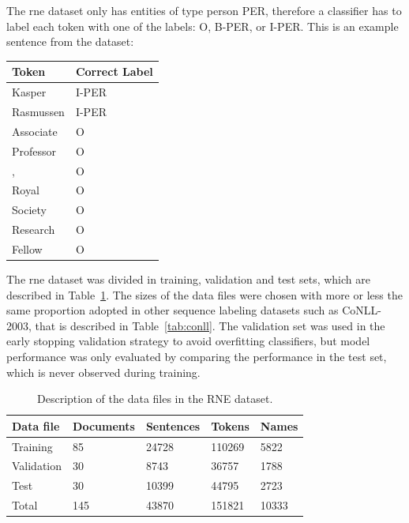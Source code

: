 \documentclass{nle}
\begin{document}
The \gls{rne} dataset only has entities of type person PER, therefore a classifier has to
label each token with one of the labels: O, B-PER, or I-PER. This is an example 
sentence from the dataset:

\begin{table}[h]
  \small
  \begin{center}
    \begin{tabular}{ ll }
      Token & Correct Label \\
      \midrule
      Kasper    & I-PER \\ 
      Rasmussen & I-PER \\
      Associate & O     \\
      Professor & O     \\    
      ,         & O     \\    
      Royal     & O     \\    
      Society   & O     \\    
      Research  & O     \\    
      Fellow    & O     \\    
    \end{tabular}     
  \end{center}
\end{table}

The \gls{rne} dataset was divided in training, validation and test sets, which are described in 
Table~\ref{tab:dataset}. The sizes of the data files were chosen with more or 
less the same proportion adopted in other sequence labeling datasets such
as {CoNLL-2003}, that is described in Table~\ref{tab:conll}. The validation set 
was used in the early stopping 
validation strategy to avoid overfitting classifiers, but model performance 
was only evaluated by comparing the performance in the test set, which is
never observed during training.

\begin{table}[h]
  \small
  \begin{center}
    \begin{tabular}{ lllll }
      \toprule
      Data file & Documents & Sentences & Tokens & Names \\
      \midrule
      Training    & 85  & 24728 & 110269 & 5822  \\  
      Validation  & 30  & 8743  & 36757  & 1788  \\
      Test        & 30  & 10399 & 44795  & 2723  \\
      \midrule
      Total       & 145 & 43870 & 151821 & 10333 \\
      \bottomrule
    \end{tabular}
  \end{center}
  \caption{Description of the data files in the RNE dataset.}
  \label{tab:dataset}
\end{table}
\end{document}
